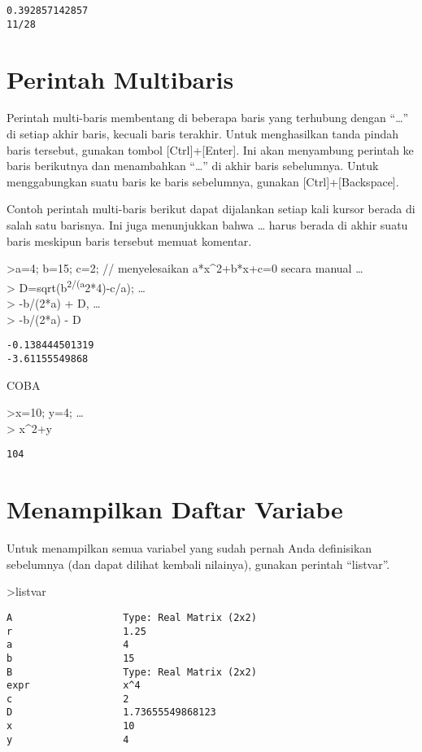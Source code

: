 \documentclass[
]{book}
\begin{document}
\begin{verbatim}
0.392857142857
11/28
\end{verbatim}

\chapter{Perintah Multibaris}\label{perintah-multibaris}

Perintah multi-baris membentang di beberapa baris yang terhubung dengan ``\ldots{}'' di setiap akhir baris, kecuali baris terakhir. Untuk menghasilkan tanda pindah baris tersebut, gunakan tombol {[}Ctrl{]}+{[}Enter{]}. Ini akan menyambung perintah ke baris berikutnya dan menambahkan ``\ldots{}'' di akhir baris sebelumnya. Untuk menggabungkan suatu baris ke baris sebelumnya, gunakan {[}Ctrl{]}+{[}Backspace{]}.

Contoh perintah multi-baris berikut dapat dijalankan setiap kali kursor berada di salah satu barisnya. Ini juga menunjukkan bahwa \ldots{} harus berada di akhir suatu baris meskipun baris tersebut memuat komentar.

\textgreater a=4; b=15; c=2; // menyelesaikan a*x\^{}2+b*x+c=0 secara manual \ldots{}\\
\textgreater{} D=sqrt(b\textsuperscript{2/(a}2*4)-c/a); \ldots{}\\
\textgreater{} -b/(2*a) + D, \ldots{}\\
\textgreater{} -b/(2*a) - D

\begin{verbatim}
-0.138444501319
-3.61155549868
\end{verbatim}

COBA

\textgreater x=10; y=4; \ldots{}\\
\textgreater{} x\^{}2+y

\begin{verbatim}
104
\end{verbatim}

\chapter{Menampilkan Daftar Variabe}\label{menampilkan-daftar-variabe}

Untuk menampilkan semua variabel yang sudah pernah Anda definisikan sebelumnya (dan dapat dilihat kembali nilainya), gunakan perintah ``listvar''.

\textgreater listvar

\begin{verbatim}
A                   Type: Real Matrix (2x2)
r                   1.25
a                   4
b                   15
B                   Type: Real Matrix (2x2)
expr                x^4
c                   2
D                   1.73655549868123
x                   10
y                   4
\end{verbatim}
\end{document}
